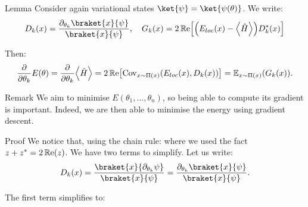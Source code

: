 \documentclass[a4paper]{article}
\begin{document}
\begin{parag}{Lemma}
    Consider again variational states $\ket{\psi} = \ket{\psi\left(\theta\right)}$. We write: 
    \[D_k\left(x\right) = \frac{\partial_{\theta_k} \braket{x}{\psi}}{\braket{x}{\psi}}, \mathspace G_k\left(x\right) = 2\cre\left[\left(E_{loc}\left(x\right) - \left\langle \hat{H} \right\rangle\right) D_k^*\left(x\right)\right]\]

    Then: 
    \[\frac{\partial}{\partial \theta_k} E\left(\theta\right) = \frac{\partial}{\partial \theta_k} \left\langle \hat{H} \right\rangle =  2\cre\left[\Cov_{x \followsdistr \Pi\left(x\right)}\left(E_{loc}\left(x\right), D_k\left(x\right)\right)\right] = \exval_{x \followsdistr \Pi\left(x\right)}\left(G_k\left(x\right)\right).\]

    \begin{subparag}{Remark}
        We aim to minimise $E\left(\theta_1, \ldots, \theta_n\right)$, so being able to compute its gradient is important. Indeed, we are then able to minimise the energy using gradient descent.
    \end{subparag}
    
    \begin{subparag}{Proof}
        We notice that, using the chain rule:
        where we used the fact $z + z^* = 2\cre\left(z\right)$. We have two terms to simplify. Let us write: 
        \[D_k\left(x\right) = \frac{\braket{x}{\partial_{\theta_k} \psi}}{\braket{x}{\psi}} = \frac{\partial_{\theta_k} \braket{x}{\psi}}{\braket{x}{\psi}}.\]
        
        The first term simplifies to:
        

\end{subparag}
\end{parag}
\end{document}

